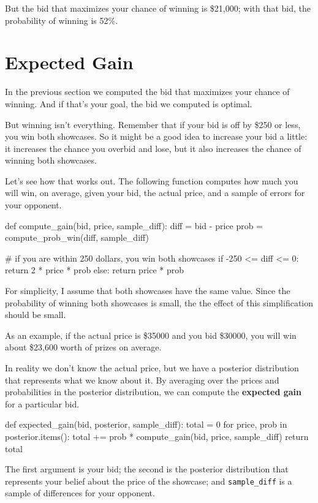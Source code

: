 \documentclass[12pt]{book}
\theoremstyle{exercise}
\newcommand{\py}[1]{{\tt #1}}%
\begin{document}
But the bid that maximizes your chance of winning is \$21,000; with that bid, the probability of winning is 52\%.


\section{Expected Gain}

In the previous section we computed the bid that maximizes your chance of winning.
And if that's your goal, the bid we computed is optimal.

But winning isn't everything.
Remember that if your bid is off by \$250 or less, you win both showcases.
So it might be a good idea to increase your bid a little: it increases the chance you overbid and lose, but it also increases the chance of winning both showcases.

Let's see how that works out.
The following function computes how much you will win, on average, given your bid, the actual price, and a sample of errors for your opponent.

\begin{code}
def compute_gain(bid, price, sample_diff):
    diff = bid - price
    prob = compute_prob_win(diff, sample_diff)

    # if you are within 250 dollars, you win both showcases
    if -250 <= diff <= 0:
        return 2 * price * prob
    else:
        return price * prob
\end{code}

For simplicity, I assume that both showcases have the same value.
Since the probability of winning both showcases is small, the the effect of this simplification should be small.

As an example, if the actual price is \$35000
and you bid \$30000,
you will win about \$23,600 worth of prizes on average.

In reality we don't know the actual price, but we have a posterior distribution that represents what we know about it.
By averaging over the prices and probabilities in the posterior distribution, we can compute the {\bf expected gain} for a particular bid.

\begin{code}
def expected_gain(bid, posterior, sample_diff):
    total = 0
    for price, prob in posterior.items():
        total += prob * compute_gain(bid, price, sample_diff)
    return total
\end{code}

The first argument is your bid; the second is the posterior distribution that represents your belief about the price of the showcase; and \py{sample_diff} is a sample of differences for your opponent.
\end{document}
